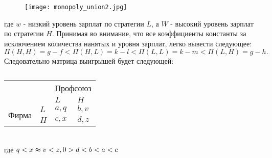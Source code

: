 \begin{figure}[h]
	\texttt{[image: monopoly\_union2.jpg]}
	\caption{}
	\label{fig:monopoly_union1}
\end{figure}

где $w$ - низкий уровень зарплат по стратегии $L$, а $W$ - высокий уровень зарплат по стратегии $H$. 
Принимая во внимание, что все коэффициенты константы за исключением количества нанятых и уровня зарплат, легко вывести следующее:
\begin{equation}
\Pi(H,H)=g-f < \Pi(H,L)=k-l < \Pi(L, L)=k-m < \Pi(L,H)=g-h.
\end{equation}
Следовательно матрица выигрышей будет следующей:
\begin{table}[h]
	
	\centering
	\begin{tabular}{|l|l|l|l|}
		\hline
		\multicolumn{2}{|l|}{\multirow{2}{*}{}} & \multicolumn{2}{l|}{Профсоюз} \\ \cline{3-4} 
		\multicolumn{2}{|l|}{}                  & $L$            & $H$            \\ \hline
		\multirow{2}{*}{Фирма}     & $L$     & $a,q$          & $b,v$          \\ \cline{2-4} 
		& $H$     & $c,x$          & $d,z$          \\ \hline
	\end{tabular}
\caption{}
	\label{table:firm}
		
		
	
\end{table}\\
где $q < x \thickapprox v < z, 0 > d < b < a < c$
